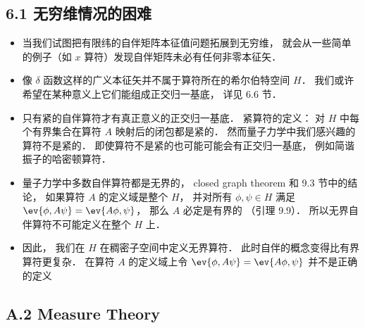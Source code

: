 
\begin{issues}
\issueDraft
\end{issues}

\subsection{6.1 无穷维情况的困难}

\begin{itemize}
\item 当我们试图把有限纬的自伴矩阵本征值问题拓展到无穷维， 就会从一些简单的例子（如 $x$ 算符）发现自伴矩阵未必有任何非零本征矢．

\item 像 $\delta$ 函数这样的广义本征矢并不属于算符所在的希尔伯特空间 $H$． 我们或许希望在某种意义上它们能组成正交归一基底， 详见 6.6 节．

\item 只有紧的自伴算符才有真正意义的正交归一基底． 紧算符的定义： 对 $H$ 中每个有界集合在算符 $A$ 映射后的闭包都是紧的． 然而量子力学中我们感兴趣的算符不是紧的． 即使算符不是紧的也可能可能会有正交归一基底， 例如简谐振子的哈密顿算符．

\item 量子力学中多数自伴算符都是无界的， closed graph theorem 和 9.3 节中的结论， 如果算符 $A$ 的定义域是整个 $H$， 并对所有 $\phi,\psi\in H$ 满足 $\ev{\phi, A\psi} = \ev{A\phi, \psi}$， 那么 $A$ 必定是有界的 （引理 9.9）． 所以无界自伴算符不可能定义在整个 $H$ 上．

\item 因此， 我们在 $H$ 在稠密子空间中定义无界算符． 此时自伴的概念变得比有界算符更复杂． 在算符 $A$ 的定义域上令 $\ev{\phi, A\psi} = \ev{A\phi, \psi}$ 并不是正确的定义
\end{itemize}


\subsection{A.2 Measure Theory}

